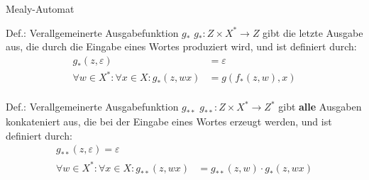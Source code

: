 \begin{frame}{Mealy-Automat}
	\begin{block}{Def.: Verallgemeinerte Ausgabefunktion $g_{\ast}$}
		$g_{\ast} : Z \times X^{\ast} \rightarrow Z$ gibt die letzte Ausgabe aus, die durch die Eingabe eines Wortes produziert wird, und ist definiert durch:
		\begin{align*}
			g_{\ast}(z,\varepsilon) &= \varepsilon \\
			\forall w \in X^{\ast} : \forall x \in X : g_{\ast}(z,wx) &= g(f_{\ast}(z,w),x)\\
		\end{align*}
	\end{block}

	\begin{block}{Def.: Verallgemeinerte Ausgabefunktion $g_{\ast\ast}$}
		$g_{\ast\ast} : Z \times X^{\ast} \rightarrow Z^{\ast}$ gibt \textbf{alle} Ausgaben konkateniert aus, die bei der Eingabe eines Wortes erzeugt werden, und ist definiert durch:
		\begin{align*}
			g_{\ast\ast}(z,\varepsilon) = \varepsilon\\
			\forall w \in X^{\ast} : \forall x \in X : g_{\ast\ast}(z,wx) &= g_{\ast\ast}(z,w) \cdot g_{\ast}(z,wx)\\
		\end{align*}
	\end{block}
\end{frame}

